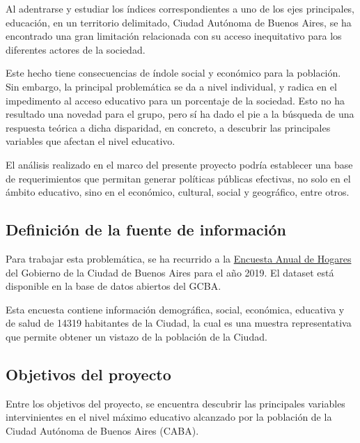 \documentclass[a4paper]{article}
\begin{document}
        Al adentrarse y estudiar los índices correspondientes a uno de los ejes principales, educación, en un territorio delimitado, Ciudad Autónoma de Buenos Aires, se ha encontrado una gran limitación relacionada con su acceso inequitativo para los diferentes actores de la sociedad. 

        Este hecho tiene consecuencias de índole social y económico para la población. Sin embargo, la principal problemática se da a nivel individual, y radica en el impedimento al acceso educativo para un porcentaje de la sociedad. Esto no ha resultado una novedad para el grupo, pero sí ha dado el pie a la búsqueda de una respuesta teórica a dicha disparidad, en concreto, a descubrir las principales variables que afectan el nivel educativo.

        El análisis realizado en el marco del presente proyecto podría establecer una base de requerimientos que permitan generar políticas públicas efectivas, no solo en el ámbito educativo, sino en el económico, cultural, social y geográfico, entre otros.

    \subsection{Definición de la fuente de información}

        Para trabajar esta problemática, se ha recurrido a la \href{https://data.buenosaires.gob.ar/dataset/encuesta-anual-hogares/resource/3a45c563-396d-42de-ba93-8a93729e0723}{Encuesta Anual de Hogares} del Gobierno de la Ciudad de Buenos Aires para el año 2019. El dataset está disponible en la base de datos abiertos del GCBA.

        Esta encuesta contiene información demográfica, social, económica, educativa y de salud de 14319 habitantes de la Ciudad, la cual es una muestra representativa que permite obtener un vistazo de la población de la Ciudad.

    \subsection{Objetivos del proyecto}

        Entre los objetivos del proyecto, se encuentra descubrir las principales variables intervinientes en el nivel máximo educativo alcanzado por la población de la Ciudad Autónoma de Buenos Aires (CABA).
\end{document}
